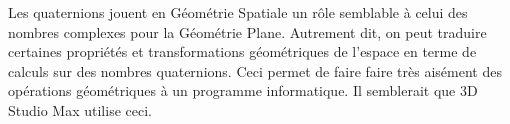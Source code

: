 \noindent Les quaternions jouent en Géométrie Spatiale un rôle semblable à celui des nombres complexes pour la Géométrie Plane. Autrement dit, on peut traduire certaines propriétés et transformations géométriques de l'espace en terme de calculs sur des nombres quaternions. Ceci permet de faire faire très aisément des opérations géométriques à un programme informatique. Il semblerait que 3D Studio Max utilise ceci.
